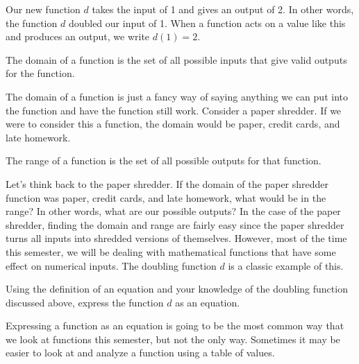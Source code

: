 \noindent
Our new function $d$ takes the input of 1 and gives an output of 2. In other words, the function $d$ doubled our input of 1. When a function acts on a value like this and produces an output, we write $d(1)=2$.

\begin{presentation}
	\begin{defn}[Domain]\label{Domain}
		The domain of a function is the set of all possible inputs that give valid outputs for the function.
	\end{defn}
\end{presentation}

The domain of a function is just a fancy way of saying anything we can put into the function and have the function still work. Consider a paper shredder. If we were to consider this a function, the domain would be paper, credit cards, and late homework. 
\begin{defn}[Range]\label{Range}
	The range of a function is the set of all possible outputs for that function.
\end{defn}

Let's think back to the paper shredder. If the domain of the paper shredder function was paper, credit cards, and late homework, what would be in the range? In other words, what are our possible outputs? In the case of the paper shredder, finding the domain and range are fairly easy since the paper shredder turns all inputs into shredded versions of themselves. However, most of the time this semester, we will be dealing with mathematical functions that have some effect on numerical inputs. The doubling function $d$ is a classic example of this. 

\begin{prblm}\label{Doubling Function}
Using the definition of an equation and your knowledge of the doubling function discussed above, express the function $d$ as an equation. \vspace{4cm}
\end{prblm}

Expressing a function as an equation is going to be the most common way that we look at functions this semester, but not the only way. Sometimes it may be easier to look at and analyze a function using a table of values. 

